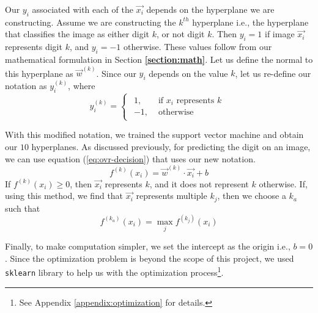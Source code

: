Our ${y_i}$ associated with each of the $\vec{x_i}$ depends on the hyperplane we are constructing. Assume we are constructing the $k^{th}$ hyperplane i.e., the hyperplane that classifies the image as either digit $k$, or not digit $k$. Then $y_i = 1$ if image $\vec{x_i}$ represents digit $k$, and $y_i = -1$ otherwise. These values follow from our mathematical formulation in Section \textbf{\ref{section:math}}. Let us define the normal to this hyperplane as $\vec{w}^{(k)}$. Since our $y_i$ depends on the value $k$, let us re-define our notation as $y^{(k)}_i$, where
\begin{equation*}
    y^{(k)}_i= 
\begin{cases}
\begin{aligned}
 1,& \text{ if } x_i \text{ represents } k\\
-1,              & \text{ otherwise}
\end{aligned}
\end{cases}
\end{equation*}

With this modified notation, we trained the support vector machine and obtain our $10$ hyperplanes. As discussed previously, for predicting the digit on an image, we can use equation (\ref{eq:ovr-decision}) that uses our new notation.
\begin{equation}
	f^{(k)}(x_i) = \vec{w}^{(k)}\cdot\vec{x_i} + b \label{eq:ovr-decision}
\end{equation}
If $f^{(k)}(x_i) \geq 0$, then $\vec{x_i}$ represents $k$, and it does not represent $k$ otherwise. If, using this method, we find that $\vec{x_i}$ represents multiple $k_j$, then we choose a $k_a$ such that
\begin{equation*}
	f^{(k_a)}(x_i) = \max_{j} f^{(k_j)}(x_i)  \label{eq:ovr-conflict}
\end{equation*}

Finally, to make computation simpler, we set the intercept as the origin i.e., $b = 0$. Since the optimization problem is beyond the scope of this project, we used \texttt{sklearn}\cite{scikit-learn} library to help us with the optimization process\footnote{See Appendix \ref{appendix:optimization} for details.}.